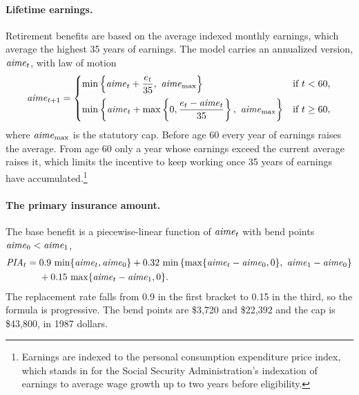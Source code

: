 \paragraph{Lifetime earnings.}
Retirement benefits are based on the average indexed monthly earnings, which average the highest 35 years of earnings. %
The model carries an annualized version, $\mathit{aime}_t$, with law of motion
\begin{equation}\label{eq:aime}
\aime_{t+1}=
\begin{cases}
\min\left\{\aime_t+\dfrac{e_t}{35},\ \aime_{\max}\right\} & \text{if } t<60,\\[0.8em]
\min\left\{\aime_t+\max\left\{0,\dfrac{e_t-\aime_t}{35}\right\},\ \aime_{\max}\right\} & \text{if } t\geq 60,
\end{cases}
\end{equation}
where $\mathit{aime}_{\max}$ is the statutory cap. %
Before age 60 every year of earnings raises the average. From age 60 only a year whose earnings exceed the current average raises it, which limits the incentive to keep working once 35 years of earnings have accumulated.\footnote{Earnings are indexed to the personal consumption expenditure price index, which stands in for the Social Security Administration's indexation of earnings to average wage growth up to two years before eligibility. %
} %

\paragraph{The primary insurance amount.}
The base benefit is a piecewise-linear function of $\mathit{aime}_t$ with bend points $\mathit{aime}_0<\mathit{aime}_1$,
\begin{equation}\label{eq:pia}
\begin{split}
\mathit{PIA}_t={}&0.9\,\min\{\mathit{aime}_t,\mathit{aime}_0\}
+0.32\,\min\left\{\max\{\mathit{aime}_t-\mathit{aime}_0,0\},\ \mathit{aime}_1-\mathit{aime}_0\right\}\\
&+0.15\,\max\{\mathit{aime}_t-\mathit{aime}_1,0\}.
\end{split}
\end{equation}
The replacement rate falls from 0.9 in the first bracket to 0.15 in the third, so the formula is progressive. %
The bend points are \$3,720 and \$22,392 and the cap is \$43,800, in 1987 dollars. %

